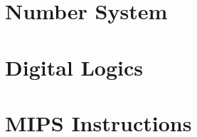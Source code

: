 \documentclass{article}
\begin{document}
\thispagestyle{empty}

\begin{minipage}[t]{0.2\linewidth}
    \section{Number System}
    
\end{minipage}
\begin{minipage}[t]{0.32\linewidth}
    \section{Digital Logics}
    
\end{minipage}
\begin{minipage}[t]{0.48\linewidth}
    \section{MIPS Instructions}
    
\end{minipage}
\end{document}
